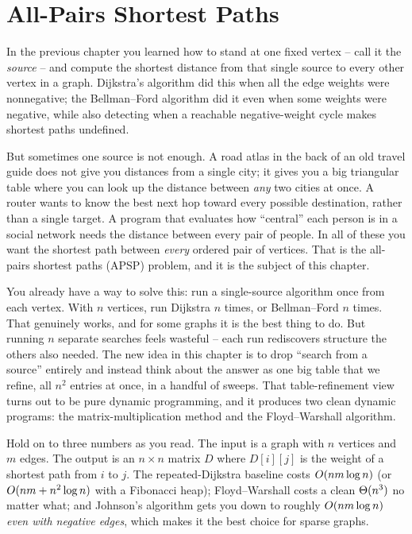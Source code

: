 \chapter{All-Pairs Shortest Paths}

In the previous chapter you learned how to stand at one fixed vertex -- call it
the \emph{source} -- and compute the shortest distance from that single source
to every other vertex in a graph. Dijkstra's algorithm did this when all the
edge weights were nonnegative; the Bellman--Ford algorithm did it even when
some weights were negative, while also detecting when a reachable
negative-weight cycle makes shortest paths undefined.

But sometimes one source is not enough. A road atlas in the back of an old
travel guide does not give you distances from a single city; it gives you a
big triangular table where you can look up the distance between \emph{any} two
cities at once. A router wants to know the best next hop toward every possible
destination, rather than a single target. A program that evaluates how ``central'' each person is
in a social network needs the distance between every pair of people. In all of
these you want the shortest path between \emph{every} ordered pair of vertices.
That is the all-pairs shortest paths (APSP) problem, and it is the subject of this
chapter.

\begin{intuitionbox}
You already have a way to solve this: run a single-source algorithm once
from each vertex. With $n$ vertices, run Dijkstra $n$ times, or Bellman--Ford
$n$ times. That genuinely works, and for some graphs it is the best thing to
do. But running $n$ separate searches feels wasteful -- each run rediscovers
structure the others also needed. The new idea in this chapter is to drop
``search from a source'' entirely and instead think about the answer as
one big table that we refine, all $n^2$ entries at once, in a handful of
sweeps. That table-refinement view turns out to be pure dynamic programming,
and it produces two clean dynamic programs:
the matrix-multiplication method and the Floyd--Warshall algorithm.
\end{intuitionbox}

\begin{focusbox}
Hold on to three numbers as you read. The input is a graph with $n$ vertices
and $m$ edges. The output is an $n \times n$ matrix $D$ where $D[i][j]$ is the
weight of a shortest path from $i$ to $j$. The repeated-Dijkstra baseline costs
$O(n m \log n)$ (or $O(n m + n^2 \log n)$ with a Fibonacci heap);
Floyd--Warshall costs a clean $\Theta(n^3)$ no matter what; and Johnson's
algorithm gets you down to roughly $O(n m \log n)$ \emph{even with negative
edges}, which makes it the best choice for sparse graphs.
\end{focusbox}

